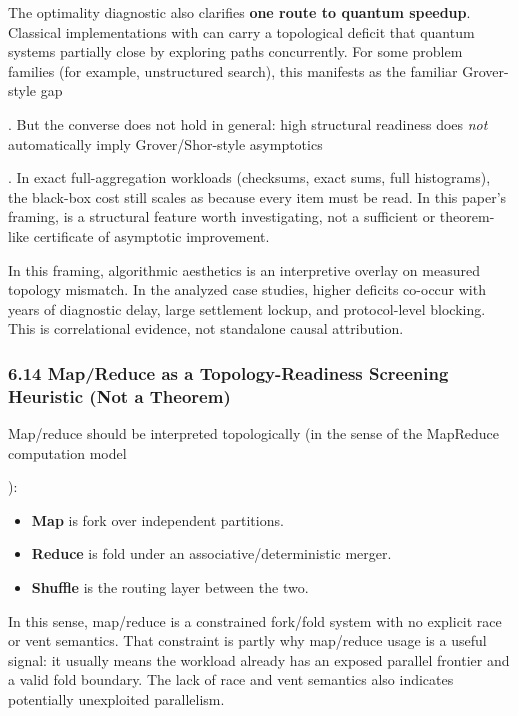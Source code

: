 \documentclass[
]{article}
\providecommand{\tightlist}{%
  \setlength{\itemsep}{0pt}\setlength{\parskip}{0pt}}
\begin{document}
The optimality diagnostic also clarifies \textbf{one route to quantum
speedup}. Classical implementations with can carry a topological deficit
that quantum systems partially close by exploring paths concurrently.
For some problem families (for example, unstructured search), this
manifests as the familiar Grover-style gap

. But the converse does not hold in general: high structural readiness
does \emph{not} automatically imply Grover/Shor-style asymptotics

. In exact full-aggregation workloads (checksums, exact sums, full
histograms), the black-box cost still scales as because every item must
be read. In this paper's framing, is a structural feature worth
investigating, not a sufficient or theorem-like certificate of
asymptotic improvement.

In this framing, algorithmic aesthetics is an interpretive overlay on
measured topology mismatch. In the analyzed case studies, higher
deficits co-occur with years of diagnostic delay, large settlement
lockup, and protocol-level blocking. This is correlational evidence, not
standalone causal attribution.

\subsubsection{\texorpdfstring{\textbf{6.14 Map/Reduce as a
Topology-Readiness Screening Heuristic (Not a
Theorem)}}{6.14 Map/Reduce as a Topology-Readiness Screening Heuristic (Not a Theorem)}}\label{mapreduce-as-a-topology-readiness-screening-heuristic-not-a-theorem}

Map/reduce should be interpreted topologically (in the sense of the
MapReduce computation model

):

\begin{itemize}
\tightlist
\item
  \textbf{Map} is fork over independent partitions.\\
\item
  \textbf{Reduce} is fold under an associative/deterministic merger.\\
\item
  \textbf{Shuffle} is the routing layer between the two.
\end{itemize}

In this sense, map/reduce is a constrained fork/fold system with no
explicit race or vent semantics. That constraint is partly why
map/reduce usage is a useful signal: it usually means the workload
already has an exposed parallel frontier and a valid fold boundary. The
lack of race and vent semantics also indicates potentially unexploited
parallelism.
\end{document}
